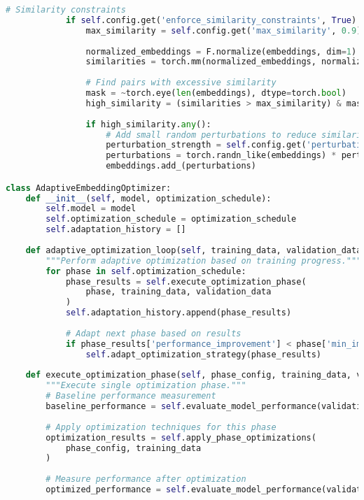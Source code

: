 \begin{lstlisting}[language=Python, caption=Geometric embedding optimization framework]
            # Similarity constraints
            if self.config.get('enforce_similarity_constraints', True):
                max_similarity = self.config.get('max_similarity', 0.9)
                
                normalized_embeddings = F.normalize(embeddings, dim=1)
                similarities = torch.mm(normalized_embeddings, normalized_embeddings.t())
                
                # Find pairs with excessive similarity
                mask = ~torch.eye(len(embeddings), dtype=torch.bool)
                high_similarity = (similarities > max_similarity) & mask
                
                if high_similarity.any():
                    # Add small random perturbations to reduce similarity
                    perturbation_strength = self.config.get('perturbation_strength', 0.1)
                    perturbations = torch.randn_like(embeddings) * perturbation_strength
                    embeddings.add_(perturbations)

class AdaptiveEmbeddingOptimizer:
    def __init__(self, model, optimization_schedule):
        self.model = model
        self.optimization_schedule = optimization_schedule
        self.adaptation_history = []
        
    def adaptive_optimization_loop(self, training_data, validation_data):
        """Perform adaptive optimization based on training progress."""
        for phase in self.optimization_schedule:
            phase_results = self.execute_optimization_phase(
                phase, training_data, validation_data
            )
            self.adaptation_history.append(phase_results)
            
            # Adapt next phase based on results
            if phase_results['performance_improvement'] < phase['min_improvement_threshold']:
                self.adapt_optimization_strategy(phase_results)
    
    def execute_optimization_phase(self, phase_config, training_data, validation_data):
        """Execute single optimization phase."""
        # Baseline performance measurement
        baseline_performance = self.evaluate_model_performance(validation_data)
        
        # Apply optimization techniques for this phase
        optimization_results = self.apply_phase_optimizations(
            phase_config, training_data
        )
        
        # Measure performance after optimization
        optimized_performance = self.evaluate_model_performance(validation_data)
        

\end{lstlisting}
